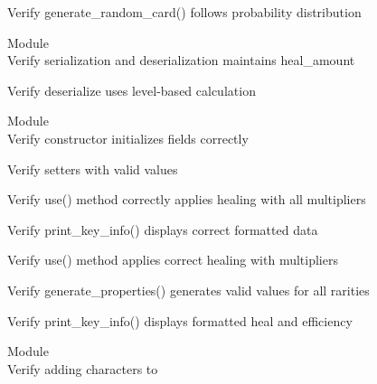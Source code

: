 \begin{DoxyRefList}
\label{test__test000067}%
%
Verify generate\+\_\+random\+\_\+card() follows probability distribution  


\item[Module \doxylink{group___healer_character}{Healer\+Character} ]\hfill \\
\label{test__test000106}%
%
Verify serialization and deserialization maintains heal\+\_\+amount  



\label{test__test000107}%
%
Verify deserialize uses level-\/based calculation  


\item[Module \doxylink{group___heal_spell}{Heal\+Spell} ]\hfill \\
\label{test__test000013}%
%
Verify constructor initializes fields correctly  



\label{test__test000014}%
%
Verify setters with valid values  



\label{test__test000016}%
%
Verify use() method correctly applies healing with all multipliers  



\label{test__test000017}%
%
Verify print\+\_\+key\+\_\+info() displays correct formatted data  



\label{test__test000018}%
%
Verify use() method applies correct healing with multipliers  



\label{test__test000019}%
%
Verify generate\+\_\+properties() generates valid values for all rarities  



\label{test__test000020}%
%
Verify print\+\_\+key\+\_\+info() displays formatted heal and efficiency  


\item[Module \doxylink{group___human_player}{Human\+Player} ]\hfill \\
\label{test__test000128}%
%
Verify adding characters to   




\end{DoxyRefList}
